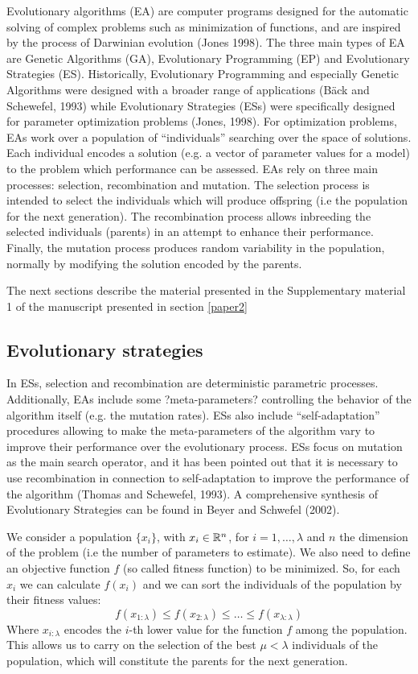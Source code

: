 Evolutionary algorithms (EA) are computer programs designed for the automatic solving of complex problems such as minimization of functions, and are inspired by the process of Darwinian evolution (Jones 1998). The three main types of EA are Genetic Algorithms (GA), Evolutionary Programming (EP) and Evolutionary Strategies (ES). Historically, Evolutionary Programming and especially Genetic Algorithms were designed with a broader range of applications (B\"ack and Schewefel, 1993) while Evolutionary Strategies (ESs) were specifically designed for parameter optimization problems (Jones, 1998). 
For optimization problems, EAs work over a population of ``individuals'' searching over the space of solutions. Each individual encodes a solution (e.g. a vector of parameter values for a model) to the problem which performance can be assessed. 
EAs rely on three main processes: selection, recombination and mutation. The selection process is intended to select the individuals which will produce offspring (i.e the population for the next generation). The recombination process allows inbreeding the selected individuals (parents) in an attempt to enhance their performance. Finally, the mutation process produces random variability in the population, normally by modifying the solution encoded by the parents. 

The next sections describe the material presented in the Supplementary material 1 of the manuscript presented in section \ref{paper2}

\subsection{Evolutionary strategies}

In ESs, selection and recombination are deterministic parametric processes. Additionally, EAs include some ?meta-parameters? controlling the behavior of the algorithm itself (e.g. the mutation rates). ESs also include ``self-adaptation'' procedures allowing to make the meta-parameters of the algorithm vary to improve their performance over the evolutionary process. ESs focus on mutation as the main search operator, and it has been pointed out that it is necessary to use recombination in connection to self-adaptation to improve the performance of the algorithm (Thomas and Schewefel, 1993). A comprehensive synthesis of Evolutionary Strategies can be found in Beyer and Schwefel (2002). 

We consider a population $\{x_i\}$, with $x_i \in \mathbb{R}^n$, for $i=1, \dots,  \lambda$ and $n$ the dimension of the problem (i.e the number of parameters to estimate). We also need to define an objective function $f$ (so called fitness function) to be minimized. So, for each $x_i$ we can calculate $f(x_i)$ and we can sort the individuals of the population by their fitness values:
\begin{equation}
f(x_{1:\lambda}) \leq f(x_{2:\lambda}) \leq \dots \leq f(x_{\lambda:\lambda})
\label{eq-sort}
\end{equation}
Where $x_{i:\lambda}$ encodes the $i$-th lower value for the function $f$ among the population. This allows us to carry on the selection of the best $\mu < \lambda$ individuals of the population, which will constitute the parents for the next generation. 


